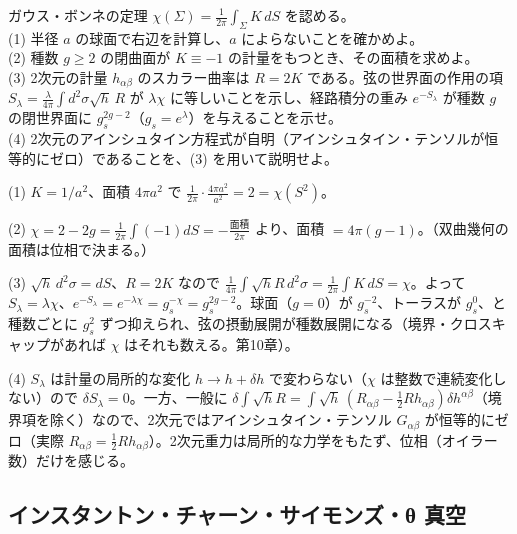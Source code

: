 \begin{problem}[難易度 A]\label{ch08-prob-gb}
ガウス・ボンネの定理 $\chi(\Sigma)=\frac1{2\pi}\int_\Sigma K\,dS$ を認める。\\
(1) 半径 $a$ の球面で右辺を計算し、$a$ によらないことを確かめよ。\\
(2) 種数 $g\ge2$ の閉曲面が $K\equiv-1$ の計量をもつとき、その面積を求めよ。\\
(3) 2次元の計量 $h_{\alpha\beta}$ のスカラー曲率は $R=2K$ である。弦の世界面の作用の項 $S_\lambda=\frac{\lambda}{4\pi}\int d^2\sigma\sqrt h\,R$ が $\lambda\chi$ に等しいことを示し、経路積分の重み $e^{-S_\lambda}$ が種数 $g$ の閉世界面に $g_s^{2g-2}$（$g_s=e^\lambda$）を与えることを示せ。\\
(4) 2次元のアインシュタイン方程式が自明（アインシュタイン・テンソルが恒等的にゼロ）であることを、(3) を用いて説明せよ。
\end{problem}

\begin{solution}
(1) $K=1/a^2$、面積 $4\pi a^2$ で $\frac1{2\pi}\cdot\frac{4\pi a^2}{a^2}=2=\chi(S^2)$。

(2) $\chi=2-2g=\frac1{2\pi}\int(-1)dS=-\frac{\text{面積}}{2\pi}$ より、面積 $=4\pi(g-1)$。（双曲幾何の面積は位相で決まる。）

(3) $\sqrt h\,d^2\sigma=dS$、$R=2K$ なので $\frac{1}{4\pi}\int\sqrt hR\,d^2\sigma=\frac1{2\pi}\int K\,dS=\chi$。よって $S_\lambda=\lambda\chi$、$e^{-S_\lambda}=e^{-\lambda\chi}=g_s^{-\chi}=g_s^{2g-2}$。球面（$g=0$）が $g_s^{-2}$、トーラスが $g_s^0$、と種数ごとに $g_s^2$ ずつ抑えられ、弦の摂動展開が種数展開になる（境界・クロスキャップがあれば $\chi$ はそれも数える。第10章）。

(4) $S_\lambda$ は計量の局所的な変化 $h\to h+\delta h$ で変わらない（$\chi$ は整数で連続変化しない）ので $\delta S_\lambda=0$。一方、一般に $\delta\int\sqrt hR=\int\sqrt h\,(R_{\alpha\beta}-\frac12Rh_{\alpha\beta})\delta h^{\alpha\beta}$（境界項を除く）なので、2次元ではアインシュタイン・テンソル $G_{\alpha\beta}$ が恒等的にゼロ（実際 $R_{\alpha\beta}=\frac12Rh_{\alpha\beta}$）。2次元重力は局所的な力学をもたず、位相（オイラー数）だけを感じる。
\end{solution}

\subsection{インスタントン・チャーン・サイモンズ・θ 真空}

